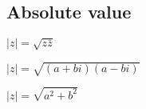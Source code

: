 
\subsection{Absolute value}

\(|z|=\sqrt {z\bar z}\)

\(|z|=\sqrt {(a+bi)(a-bi)}\)

\(|z|=\sqrt {a^2+b^2}\)
